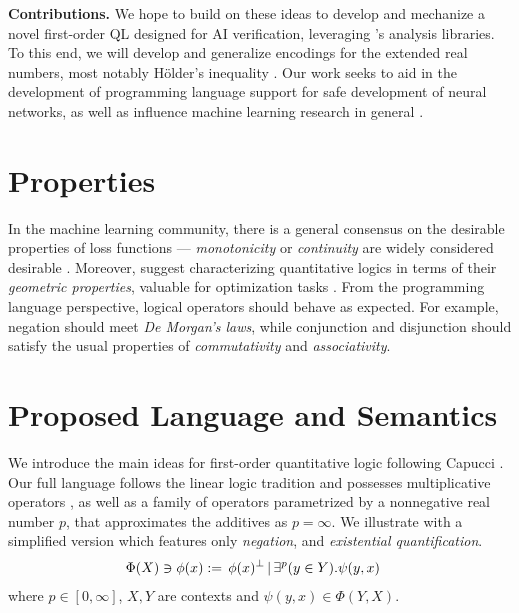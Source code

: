\documentclass[sigplan, screen, review, nonacm]{acmart}
\begin{document}
\textbf{Contributions.} We hope to build on these ideas to develop and mechanize a novel first-order QL designed for AI verification, leveraging \mathcomp{}'s analysis libraries. To this end, we will develop and generalize encodings for the extended real numbers, most notably Hölder's inequality \cite{mitrinovic1970analytic}. Our work seeks to aid in the development of programming language support for safe development of neural networks, as well as influence machine learning research in general \cite{vehicle,grant}.  

\section{Properties}
In the machine learning community, there is a general consensus on the desirable properties of loss functions --- \textit{monotonicity} or \textit{continuity} are widely considered desirable \cite{van2022analyzing}. Moreover, \citeauthor{varnai2020robustness} suggest characterizing quantitative logics in terms of their \textit{geometric properties}, valuable for optimization tasks \cite{varnai2020robustness}. From the programming language perspective, logical operators should behave as expected. For example, negation should meet \textit{De Morgan's laws}, while conjunction and disjunction should satisfy the usual properties of \textit{commutativity} and \textit{associativity}. 

\section{Proposed Language and Semantics}
\label{LanguageAndSemantics}
 We introduce the main ideas for first-order quantitative logic following Capucci \cite{capucci2024quantifiers}. Our full language follows the linear logic tradition and possesses multiplicative operators \citep{Wadler1993}, as well as a family of operators parametrized by a nonnegative real number $p$, that approximates the additives as $p = \infty$. We illustrate with a simplified version which features only \textit{negation}, and \textit{existential quantification}.
\begin{equation*}
    \begin{split}
        &\Phi(X) \ni \phi(x) := \,  \phi(x) ^\bot \,
        |\, \exists^{p}(y \in Y).\psi(y,x)
    \end{split}
\end{equation*}
where $p \in [0,\infty]$, $X, Y$ are contexts and $\psi(y,x) \in \Phi(Y,X)$.
\end{document}
